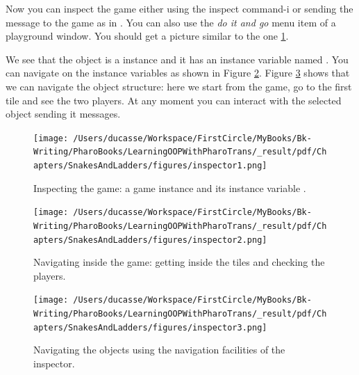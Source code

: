 \documentclass[10pt,twoside,english]{_support/latex/sbabook/sbabook}
\begin{document}
Now you can inspect the game either using the inspect command-i or sending the message  to the game as in . You can also use the \textit{do it and go} menu item of a playground window.  You should get a picture similar to the one \ref{fig:ginspector1}.

We see that the object is a  instance and it has an instance variable named . You can navigate on the instance variables as shown in Figure \ref{fig:ginspector2}. Figure \ref{fig:ginspector3} shows that we can navigate the object structure: here we start from the game, go to the first tile and see the two players. At any moment you can interact with the selected object sending it messages.


\begin{figure}

\begin{center}
\texttt{[image: /Users/ducasse/Workspace/FirstCircle/MyBooks/Bk-Writing/PharoBooks/LearningOOPWithPharoTrans/\_result/pdf/Chapters/SnakesAndLadders/figures/inspector1.png]}\caption{Inspecting the game: a game instance and its instance variable .\label{fig:ginspector1}}\end{center}
\end{figure}



\begin{figure}

\begin{center}
\texttt{[image: /Users/ducasse/Workspace/FirstCircle/MyBooks/Bk-Writing/PharoBooks/LearningOOPWithPharoTrans/\_result/pdf/Chapters/SnakesAndLadders/figures/inspector2.png]}\caption{Navigating inside the game: getting inside the tiles and checking the players.\label{fig:ginspector2}}\end{center}
\end{figure}



\begin{figure}

\begin{center}
\texttt{[image: /Users/ducasse/Workspace/FirstCircle/MyBooks/Bk-Writing/PharoBooks/LearningOOPWithPharoTrans/\_result/pdf/Chapters/SnakesAndLadders/figures/inspector3.png]}\caption{Navigating the objects using the navigation facilities of the inspector.\label{fig:ginspector3}}\end{center}
\end{figure}
\end{document}
